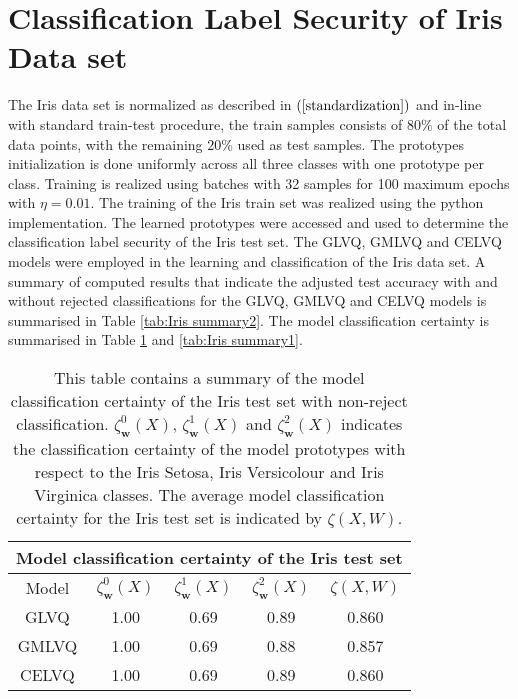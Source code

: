 \section{Classification Label Security of Iris Data set}
The Iris data set is normalized as described in $\left( \ref{standardization}\right) $  and in-line with standard train-test procedure, the train samples consists of $80\%$ of the total data points, with the remaining $20\%$ used as test samples. The prototypes initialization is done uniformly across all three classes with one prototype per class. Training is realized using batches with 32 samples for 100 maximum epochs with $\eta =0.01$. The training of the Iris train set was realized using the python implementation\cite{Ravichandran2020}.
The learned prototypes were accessed and used to determine the classification label security of the Iris test set. The GLVQ, GMLVQ and CELVQ models were employed in the learning and classification of the Iris data set. A summary of computed results that indicate the adjusted test accuracy with and without rejected classifications for the GLVQ, GMLVQ and CELVQ models is summarised in Table \ref{tab:Iris summary2}. The model classification certainty is summarised in Table \ref{tab:Iris summary} and \ref{tab:Iris summary1}.
\begin{table}[H]
	\centering
	\begin{tabular}{ |c|c|c|c|c|  }
		\hline
		\multicolumn{5}{|c|}{Model classification certainty of the Iris test set} \\
		\hline
		Model &$\zeta_{\mathbf{w}}^{0}(X) $   & $\zeta_{\mathbf{w}}^{1}(X)$ &$\zeta_{\mathbf{w}}^{2}(X)$  &$\zeta(X,W)$   \\
		\hline
		GLVQ & 1.00 &0.69  & 0.89 &0.860  \\
		GMLVQ &1.00 &0.69  &0.88 &0.857   \\
		CELVQ  &1.00 &0.69  &0.89 & 0.860   \\		
		\hline
	\end{tabular}
	\caption[Summary of model classification certainty of the Iris test set]{\label{tab:Iris summary}This table contains a summary of the model classification certainty of the Iris test set with non-reject classification.\hspace{2pt} $\zeta_{\mathbf{w}}^{0}(X) $,\hspace{2pt} $\zeta_{\mathbf{w}}^{1}(X)$\hspace{2pt} and\hspace{2pt} $\zeta_{\mathbf{w}}^{2}(X)$\hspace{2pt} indicates the classification certainty of the model prototypes with respect to the Iris Setosa, Iris Versicolour and Iris Virginica classes. The average model classification certainty for the Iris test set is indicated by\hspace{2pt} $\zeta(X,W)$.}
	
	
\end{table}


